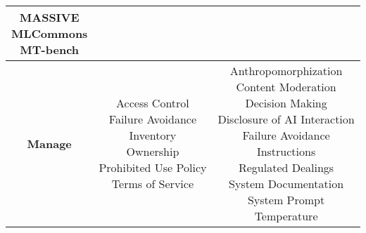 \documentclass[fleqn]{article}
\begin{document}
\begin{table}[H]
\begin{tabular}{|c|c|c|}
{			\textbullet\hspace{3pt} MASSIVE \\ 
			\textbullet\hspace{3pt} MLCommons \\ 
			\textbullet\hspace{3pt} MT-bench  \\ 
		}
		\\ 
		\hline		
		\textbf{Manage} &
		\makecell[l]{ 
			\textbullet\hspace{3pt} Access Control \\ 
			\textbullet\hspace{3pt} Failure Avoidance \\ 
			\textbullet\hspace{3pt} Inventory\\ 	
			\textbullet\hspace{3pt} Ownership\\ 	
			\textbullet\hspace{3pt} Prohibited Use Policy \\ 
			\textbullet\hspace{3pt} Terms of Service \\ 
		}		
		&
		\makecell[l]{ 
			\textbullet\hspace{3pt} Anthropomorphization \\
			\textbullet\hspace{3pt} Content Moderation \\ 
			\textbullet\hspace{3pt} Decision Making \\ 
			\textbullet\hspace{3pt} Disclosure of AI Interaction \\ 
			\textbullet\hspace{3pt} Failure Avoidance \\
			\textbullet\hspace{3pt} Instructions\\ 			 
			\textbullet\hspace{3pt} Regulated Dealings \\ 
			\textbullet\hspace{3pt} System Documentation\\ 			
			\textbullet\hspace{3pt} System Prompt \\ 
			\textbullet\hspace{3pt} Temperature \\ 
		}	
		\\
		\hline
	\end{tabular}
	\label{table:low_risk_plan_by_gai_risk}
\end{table}
\end{document}
